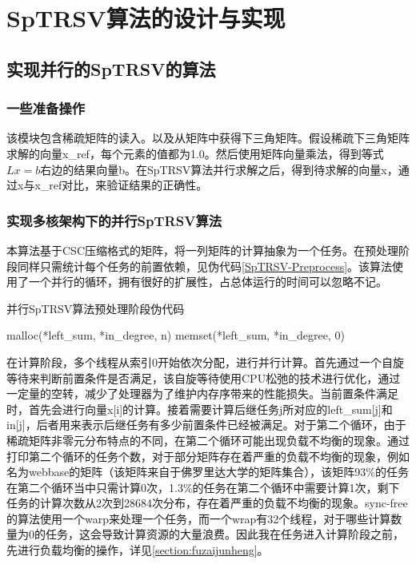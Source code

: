 \chapter{SpTRSV算法的设计与实现}

\section{实现并行的SpTRSV的算法}

\subsection{一些准备操作}
该模块包含稀疏矩阵的读入。以及从矩阵中获得下三角矩阵。假设稀疏下三角矩阵求解的向量x\_ref，每个元素的值都为1.0。然后使用矩阵向量乘法，得到等式$Lx=b$右边的结果向量b。在SpTRSV算法并行求解之后，得到待求解的向量x，通过x与x\_ref对比，来验证结果的正确性。

\subsection{实现多核架构下的并行SpTRSV算法}

本算法基于CSC压缩格式的矩阵，将一列矩阵的计算抽象为一个任务。在预处理阶段同样只需统计每个任务的前置依赖，见伪代码\ref{SpTRSV-Preprocess}。该算法使用了一个并行的循环，拥有很好的扩展性，占总体运行的时间可以忽略不记。

\begin{algorithm}[htbp]
    \caption{并行SpTRSV算法预处理阶段伪代码\label{SpTRSV-Preprocess}}
    malloc(*left\_sum, *in\_degree, n)\;
    memset(*left\_sum, *in\_degree, 0)\;
\end{algorithm}

在计算阶段，多个线程从索引0开始依次分配，进行并行计算。首先通过一个自旋等待来判断前置条件是否满足，该自旋等待使用CPU松弛的技术进行优化，通过一定量的空转，减少了处理器为了维护内存序带来的性能损失。当前置条件满足时，首先会进行向量x[i]的计算。接着需要计算后继任务j所对应的left\_sum[j]和in[j]，后者用来表示后继任务有多少前置条件已经被满足。对于第二个循环，由于稀疏矩阵非零元分布特点的不同，在第二个循环可能出现负载不均衡的现象。通过打印第二个循环的任务个数，对于部分矩阵存在着严重的负载不均衡的现象，例如名为webbase的矩阵（该矩阵来自于佛罗里达大学的矩阵集合\cite{davis2011university}），该矩阵93\%的任务在第二个循环当中只需计算0次，1.3\%的任务在第二个循环中需要计算1次，剩下任务的计算次数从2次到28684次分布，存在着严重的负载不均衡的现象。sync-free的算法使用一个warp来处理一个任务，而一个wrap有32个线程，对于哪些计算数量为0的任务，这会导致计算资源的大量浪费。因此我在任务进入计算阶段之前，先进行负载均衡的操作，详见\ref{section:fuzaijunheng}。

